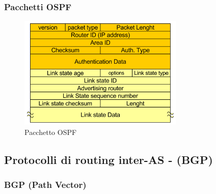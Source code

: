 \subsubsection{Pacchetti OSPF}

\begin{figure}[h!]
    \centering
    \includegraphics[width=0.7\textwidth]{images/pacchettoospf.png}
    \caption{Pacchetto OSPF}
    \label{fig:pacchettoospf}
\end{figure}

\subsection{Protocolli di routing inter-AS - (BGP)}
\subsubsection{BGP (Path Vector)}

